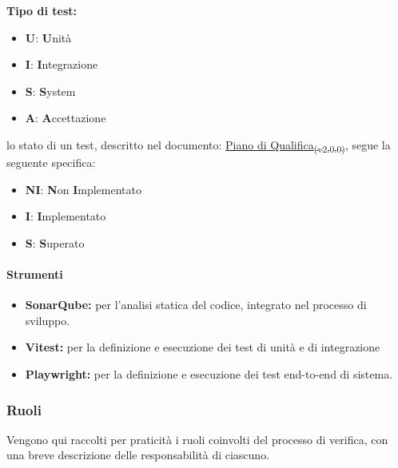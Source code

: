 \documentclass[a4paper,12pt]{article}
\begin{document}
\textbf{Tipo di test:}
\begin{itemize}
    \item \textbf{U}: \textbf{U}nità
    \item \textbf{I}: \textbf{I}ntegrazione
    \item \textbf{S}: \textbf{S}ystem
    \item \textbf{A}: \textbf{A}ccettazione
\end{itemize}

lo stato di un test, descritto nel documento: \href{https://7-zpus.github.io/Docs/assets/3_PB/DocumentiEsterni/PianoDiQualifica.pdf}{Piano di Qualifica\textsubscript{(v2.0.0)}}, segue la seguente specifica:
\begin{itemize}
    \item \textbf{NI}: \textbf{N}on \textbf{I}mplementato
    \item \textbf{I}: \textbf{I}mplementato
    \item \textbf{S}: \textbf{S}uperato
\end{itemize}

\paragraph{Strumenti}
\begin{itemize}
    \item \textbf{SonarQube:} per l'analisi statica del codice, integrato nel processo di sviluppo.
    \item \textbf{Vitest:} per la definizione e esecuzione dei test di unità e di integrazione
    \item \textbf{Playwright:} per la definizione e esecuzione dei test end-to-end di sistema.
\end{itemize}

\subsubsection{Ruoli}
Vengono qui raccolti per praticità i ruoli coinvolti del processo di verifica,
con una breve descrizione delle responsabilità di ciascuno.
\end{document}

